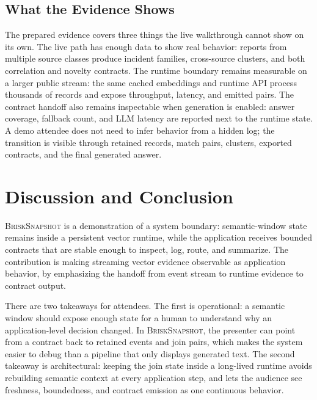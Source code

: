 \documentclass[sigconf]{acmart}
\newcommand{\system}{\textsc{BriskSnapshot}}
\begin{document}
\subsection{What the Evidence Shows}

The prepared evidence covers three things the live walkthrough cannot show on its own. The live path has enough data to show real behavior: reports from multiple source classes produce incident families, cross-source clusters, and both correlation and novelty contracts. The runtime boundary remains measurable on a larger public stream: the same cached embeddings and runtime API process thousands of records and expose throughput, latency, and emitted pairs. The contract handoff also remains inspectable when generation is enabled: answer coverage, fallback count, and LLM latency are reported next to the runtime state. A demo attendee does not need to infer behavior from a hidden log; the transition is visible through retained records, match pairs, clusters, exported contracts, and the final generated answer.

\section{Discussion and Conclusion}

\system{} is a demonstration of a system boundary: semantic-window state remains inside a persistent vector runtime, while the application receives bounded contracts that are stable enough to inspect, log, route, and summarize. The contribution is making streaming vector evidence observable as application behavior, by emphasizing the handoff from event stream to runtime evidence to contract output.

There are two takeaways for attendees. The first is operational: a semantic window should expose enough state for a human to understand why an application-level decision changed. In \system{}, the presenter can point from a contract back to retained events and join pairs, which makes the system easier to debug than a pipeline that only displays generated text. The second takeaway is architectural: keeping the join state inside a long-lived runtime avoids rebuilding semantic context at every application step, and lets the audience see freshness, boundedness, and contract emission as one continuous behavior.



\end{document}
